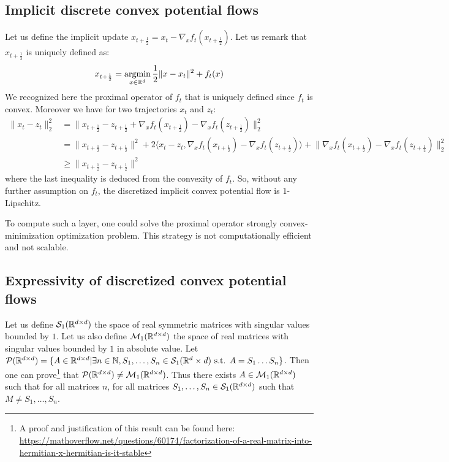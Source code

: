 \subsection{Implicit discrete convex potential flows}
\label{sup:implicit}

Let us define the implicit update $x_{t+\frac12} = x_{t}-\nabla_xf_{t}(x_{t+\frac12})$. Let us remark that $x_{t+\frac12}$ is uniquely defined as:
\begin{align*}
 x_{t+\frac12} =\operatorname*{argmin}_{x\in\mathbb{R}^d} \frac 12\lVert x-x_t\rVert^2+ f_t(x)  
\end{align*}
We recognized here the proximal operator of $f_t$ that is uniquely defined since $f_t$ is convex. Moreover we have for two trajectories $x_t$ and $z_t$:
\begin{align*}
   \lVert x_t-z_t\rVert^2_2& =  \lVert x_{t+\frac12}-z_{t+\frac12} +\nabla_xf_{t}(x_{t+\frac12})-\nabla_xf_{t}(z_{t+\frac12}) \rVert^2_2 \\
   &=  \lVert x_{t+\frac12}-z_{t+\frac12}\rVert^2 + 2\langle x_t-z_t,\nabla_xf_{t}(x_{t+\frac12})-\nabla_xf_{t}(z_{t+\frac12})\rangle +\lVert\nabla_xf_{t}(x_{t+\frac12})-\nabla_xf_{t}(z_{t+\frac12}) \rVert^2_2 \\
   &\geq  \lVert x_{t+\frac12}-z_{t+\frac12}\rVert^2 
\end{align*}
where the last inequality is deduced from the convexity of $f_t$. So, without any further assumption on $f_t$, the discretized implicit convex potential flow is $1$-Lipschitz.

To compute such a layer, one could solve the proximal operator strongly convex-minimization optimization problem. This strategy is not computationally efficient and not scalable. 




\subsection{Expressivity of discretized convex potential flows}
\label{app:express}
Let us define $\mathcal{S}_1(\mathbb{R}^{d\times d})$ the space of real symmetric matrices with singular values bounded by $1$. Let us also define $\mathcal{M}_1(\mathbb{R}^{d\times d})$ the space of real matrices with singular values bounded by $1$ in absolute value.
Let $\mathcal{P}(\mathbb{R}^{d\times d})=\{A\in\mathbb{R}^{d\times d}|\exists n\in \mathbb{N},S_1,\dots,S_n\in \mathcal{S}_1(\mathbb{R}^d\times d)\text{ s.t. } A = S_1\dots S_n\}$. Then one can prove\footnote{A proof and justification of this result can be found here: \url{https://mathoverflow.net/questions/60174/factorization-of-a-real-matrix-into-hermitian-x-hermitian-is-it-stable}} that $\mathcal{P}(\mathbb{R}^{d\times d}) \neq \mathcal{M}_1(\mathbb{R}^{d\times d})$. Thus there exists $A\in\mathcal{M}_1(\mathbb{R}^{d\times d})$ such that for all matrices $n$, for all matrices $S_1,\dots,S_n\in\mathcal{S}_1(\mathbb{R}^{d\times d})$ such that $M\neq S_1,\dots,S_n$. 

